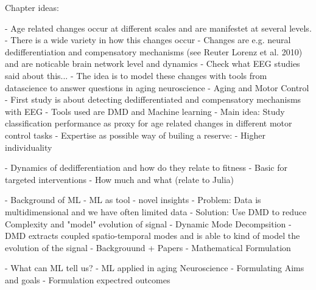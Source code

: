 Chapter ideas: 

- Age related changes occur at different scales and are manifestet at several levels. 
- There is a wide variety in how this changes occur
- Changes are e.g. neural dedifferentiation and compensatory mechanisms (see Reuter Lorenz et al. 2010) and are noticable brain network level and dynamics
- Check what EEG studies said about this...
- The idea is to model these changes with tools from datascience to answer questions in aging neuroscience 
	- Aging and Motor Control 
		- First study is about detecting dedifferentiated and compensatory mechanisms with EEG
		- Tools used are DMD and Machine learning
		- Main idea: Study classification performance as proxy for age related changes in different motor control tasks 
	- Expertise as possible way of builing a reserve: 
		- Higher individuality 
 
	- Dynamics of dedifferentiation and how do they relate to fitness
		- Basic for targeted interventions 
		- How much and what (relate to Julia)

- Background of ML
	- ML as tool 
	- novel insights 
	- Problem: Data is multidimensional and we have often limited data 
	- Solution: Use DMD to reduce Complexity and "model" evolution of signal 
- Dynamic Mode Decompsition 
	- DMD extracts coupled spatio-temporal modes and is able to kind of model the evolution of the signal 
	- Backgrouund + Papers 
	- Mathematical Formulation 


- What can ML tell us? 
    - ML applied in aging Neuroscience
	- Formulating Aims and goals 
	- Formulation expectred outcomes 

